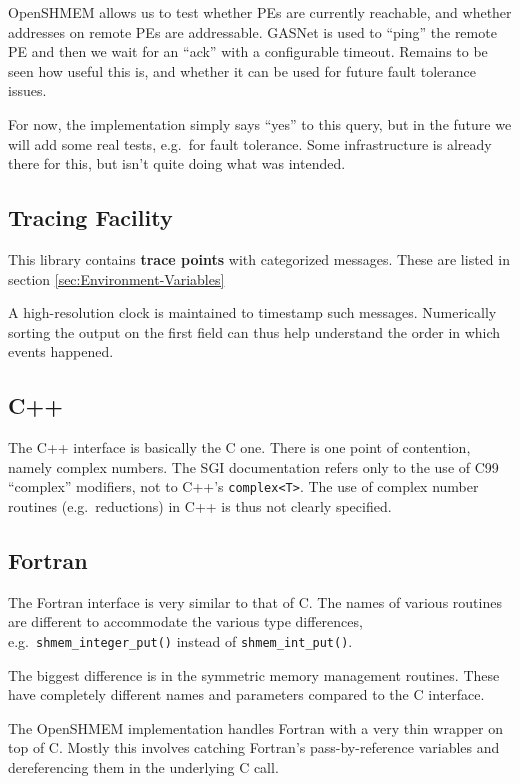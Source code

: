 \documentclass[english]{article}
\begin{document}
OpenSHMEM allows us to test whether PEs are currently reachable, and
whether addresses on remote PEs are addressable. GASNet is used to
``ping'' the remote PE and then we wait for an ``ack'' with a
configurable timeout. Remains to be seen how useful this is, and
whether it can be used for future fault tolerance issues.

For now, the implementation simply says ``yes'' to this query, but in
the future we will add some real tests, e.g.\ for fault tolerance.
Some infrastructure is already there for this, but isn't quite doing
what was intended.

\subsection{Tracing Facility}

This library contains \textbf{trace points} with categorized
messages. These are listed in section \ref{sec:Environment-Variables}

A high-resolution clock is maintained to timestamp such messages.
Numerically sorting the output on the first field can thus help
understand the order in which events happened.

\subsection{C++}

The C++ interface is basically the C one. There is one point of
contention, namely complex numbers. The SGI documentation refers only
to the use of C99 ``complex'' modifiers, not to C++'s
\texttt{complex<T>}.  The use of complex number routines (e.g.\
reductions) in C++ is thus not clearly specified.

\subsection{Fortran}

The Fortran interface is very similar to that of C. The names of
various routines are different to accommodate the various type
differences, e.g.\ \texttt{shmem\_integer\_put()} instead of
\texttt{shmem\_int\_put()}.

The biggest difference is in the symmetric memory management routines.
These have completely different names and parameters compared to the C
interface.

The OpenSHMEM implementation handles Fortran with a very thin wrapper
on top of C. Mostly this involves catching Fortran's pass-by-reference
variables and dereferencing them in the underlying C call.
\end{document}
